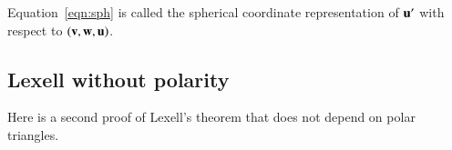 \begin{definition}\label{def:sph}
Equation~\ref{eqn:sph} is called the spherical coordinate representation of
${\mathbf u}'$ with respect to $({\mathbf v},{\mathbf w},{\mathbf u})$.   
\end{definition}
%
%
%
%

%
%
%


\subsection{Lexell without polarity}

Here is a second proof of Lexell's theorem that does not depend on polar triangles.

